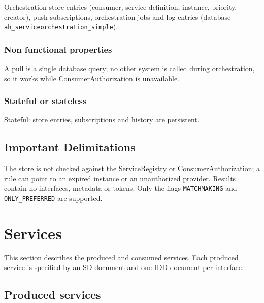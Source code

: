 \documentclass[a4paper]{arrowhead}
\begin{document}
Orchestration store entries (consumer, service definition, instance, priority, creator), push subscriptions, orchestration jobs and log entries (database \texttt{ah\_\allowbreak{}serviceorchestration\_\allowbreak{}simple}).

\subsubsection{Non functional properties}

A pull is a single database query; no other system is called during orchestration, so it works while Consumer\allowbreak{}Authorization is unavailable.

\subsubsection{Stateful or stateless}

Stateful: store entries, subscriptions and history are persistent.

\subsection{Important Delimitations}
\label{sec:delimitations}

The store is not checked against the ServiceRegistry or Consumer\allowbreak{}Authorization; a rule can point to an expired instance or an unauthorized provider. Results contain no interfaces, metadata or tokens. Only the flags \texttt{MATCHMAKING} and \texttt{ONLY\_\allowbreak{}PREFERRED} are supported.

\newpage

\section{Services}
\label{sec:services}

This section describes the produced and consumed services. Each produced service is specified by an SD document and one IDD document per interface.

\subsection{Produced services}
\end{document}
